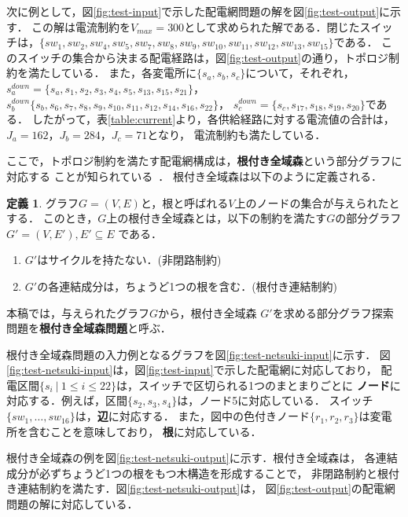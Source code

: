 次に例として，図\ref{fig:test-input}で示した配電網問題の解を図\ref{fig:test-output}に示す．
この解は電流制約を$V_{max}=300$として求められた解である．閉じたスイッチは，$\{sw_{1},sw_{2},
sw_{4},sw_{5},sw_{7},sw_{8},sw_{9},sw_{10},sw_{11},sw_{12},sw_{13},sw_{15}\}$である．
このスイッチの集合から決まる配電経路は，図\ref{fig:test-output}の通り，トポロジ制約を満たしている．
また，各変電所に$\{s_a,s_b,s_c\}$について，それぞれ，
$s_a^{down}=\{s_a,s_1,s_2,s_3,s_4,s_5,s_{13},s_{15},s_{21}\}$，
$s_b^{down}\{s_b,s_6,s_7,s_8,s_9,s_{10},s_{11},s_{12},s_{14},s_{16},s_{22}\}$，
$s_c^{down}=\{s_c,s_{17},s_{18},s_{19},s_{20}\}$である．
したがって，表\ref{table:current}より，各供給経路に対する電流値の合計は，$J_a=162$，$J_b=284$，$J_c=71$となり，
電流制約も満たしている．

ここで，トポロジ制約を満たす配電網構成は，\textbf{根付き全域森}という部分グラフに対応する
ことが知られている~\cite{Minato:dnet:netuki}．
根付き全域森は以下のように定義される．
\theoremstyle{definition}
\newtheorem*{definition*}{定義}
\begin{definition*}
  グラフ$G=(V,E)$と，根と呼ばれる$V$上のノードの集合が与えられたとする．
  このとき，$G$上の根付き全域森とは，以下の制約を満たす$G$の部分グラフ
  $G'=(V,E'), E' \subseteq E$ である．
  \begin{enumerate}
  \item $G'$はサイクルを持たない．(非閉路制約)
  \item $G'$の各連結成分は，ちょうど1つの根を含む．(根付き連結制約)
  \end{enumerate}
本稿では，与えられたグラフ$G$から，根付き全域森
$G'$を求める部分グラフ探索問題を\textbf{根付き全域森問題}と呼ぶ．
\end{definition*}

根付き全域森問題の入力例となるグラフを図\ref{fig:test-netsuki-input}に示す．
図\ref{fig:test-netsuki-input}は，図\ref{fig:test-input}で示した配電網に対応しており，
配電区間$\{s_i ~|~ 1 \leq i \leq 22\}$は，スイッチで区切られる1つのまとまりごとに
\textbf{ノード}に対応する．例えば，区間$\{s_2,s_3,s_4\}$は，ノード5に対応している．
スイッチ$\{sw_1,\ldots,sw_{16}\}$は，\textbf{辺}に対応する．
また，図中の色付きノード$\{r_1,r_2,r_3\}$は変電所を含むことを意味しており，
\textbf{根}に対応している．

根付き全域森の例を図\ref{fig:test-netsuki-output}に示す．根付き全域森は，
各連結成分が必ずちょうど1つの根をもつ木構造を形成することで，
非閉路制約と根付き連結制約を満たす．図\ref{fig:test-netsuki-output}は，
図\ref{fig:test-output}の配電網問題の解に対応している．

